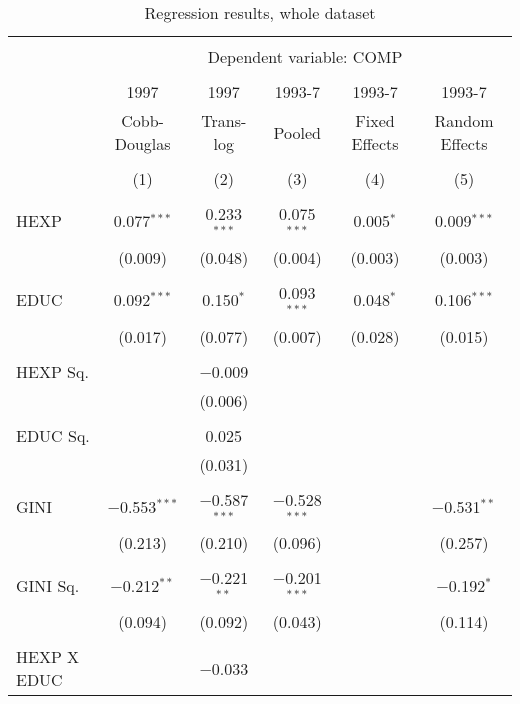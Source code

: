 \documentclass[12pt,a4paper]{article}\usepackage[]{graphicx}\usepackage[]{color}
\begin{document}
\begin{table}[!htbp] \centering 
  \caption{Regression results, whole dataset} 
  \label{tab:big} 
\scriptsize 
\begin{tabular}{@{\extracolsep{5pt}}lccccc} 
\\[-1.8ex]\hline 
\hline \\[-1.8ex] 
 & \multicolumn{5}{c}{Dependent variable: COMP} \\ 
\cline{2-6} 
\\[-1.8ex] & 1997 & 1997 & 1993-7 & 1993-7 & 1993-7 \\ 
 & Cobb-Douglas & Trans-log & Pooled & Fixed Effects & Random Effects \\ 
\\[-1.8ex] & (1) & (2) & (3) & (4) & (5)\\ 
\hline \\[-1.8ex] 
 HEXP & 0.077$^{***}$ & 0.233$^{***}$ & 0.075$^{***}$ & 0.005$^{*}$ & 0.009$^{***}$ \\ 
  & (0.009) & (0.048) & (0.004) & (0.003) & (0.003) \\ 
  & & & & & \\ 
 EDUC & 0.092$^{***}$ & 0.150$^{*}$ & 0.093$^{***}$ & 0.048$^{*}$ & 0.106$^{***}$ \\ 
  & (0.017) & (0.077) & (0.007) & (0.028) & (0.015) \\ 
  & & & & & \\ 
 HEXP Sq. &  & $-$0.009 &  &  &  \\ 
  &  & (0.006) &  &  &  \\ 
  & & & & & \\ 
 EDUC Sq. &  & 0.025 &  &  &  \\ 
  &  & (0.031) &  &  &  \\ 
  & & & & & \\ 
 GINI & $-$0.553$^{***}$ & $-$0.587$^{***}$ & $-$0.528$^{***}$ &  & $-$0.531$^{**}$ \\ 
  & (0.213) & (0.210) & (0.096) &  & (0.257) \\ 
  & & & & & \\ 
 GINI Sq. & $-$0.212$^{**}$ & $-$0.221$^{**}$ & $-$0.201$^{***}$ &  & $-$0.192$^{*}$ \\ 
  & (0.094) & (0.092) & (0.043) &  & (0.114) \\ 
  & & & & & \\ 
 HEXP X EDUC &  & $-$0.033 &  &  &  \\ 

\end{tabular}
\end{table}
\end{document}
